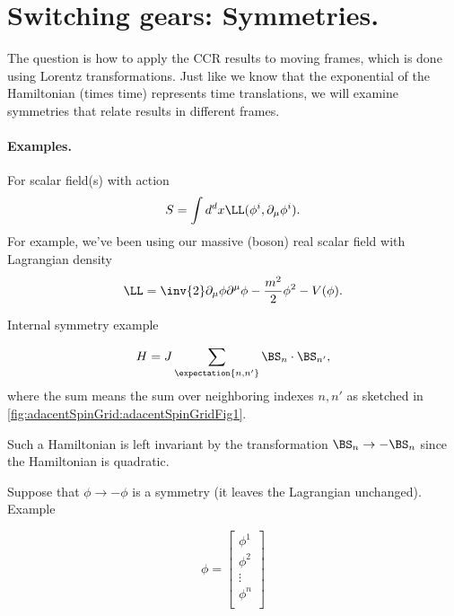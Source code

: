 %
%
\section{Switching gears: Symmetries.}

The question is how to apply the CCR results to moving frames, which is done using Lorentz transformations.  Just like we know that the exponential of the Hamiltonian (times time) represents time translations, we will examine symmetries that relate results in different frames.

\paragraph{Examples.}

For scalar field(s) with action
\begin{dmath}\label{eqn:qftLecture6:880}
S = \int d^d x \LL(\phi^i, \partial_\mu \phi^i).
\end{dmath}
For example, we've been using our massive (boson) real scalar field with Lagrangian density
\begin{dmath}\label{eqn:qftLecture6:900}
\LL = \inv{2} \partial_\mu \phi\partial^\mu \phi - \frac{m^2}{2} \phi^2 - V(\phi).
\end{dmath}

Internal symmetry example

\begin{dmath}\label{eqn:qftLecture6:920}
H = J \sum_{\expectation{n, n'}} \BS_n \cdot \BS_{n'},
\end{dmath}
where the sum means the sum over neighboring indexes \( n, n' \) as sketched in
\cref{fig:adacentSpinGrid:adacentSpinGridFig1}.

Such a Hamiltonian is left invariant by the transformation \( \BS_n \rightarrow -\BS_n \) since the Hamiltonian is quadratic.

Suppose that \( \phi \rightarrow -\phi\) is a symmetry (it leaves the Lagrangian unchanged).  Example

\begin{dmath}\label{eqn:qftLecture6:940}
\phi =
\begin{bmatrix}
\phi^1 \\
\phi^2 \\
\vdots \\
\phi^n \\
\end{bmatrix}
\end{dmath}

